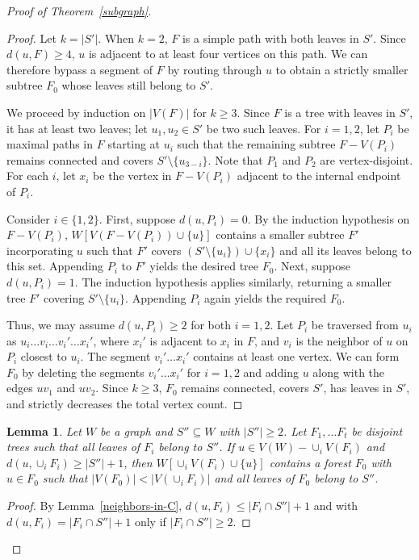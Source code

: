 \documentclass[11pt]{amsart}
\newtheorem{lemma}{Lemma}
\begin{document}
\begin{proof}[Proof of Theorem~\ref{subgraph}]
\begin{proof}
Let $k=|S'|$. When $k=2$, $F$ is a simple path with both leaves in $S'$. Since $d(u, F)\ge 4$, $u$ is adjacent to at least four vertices on this path. We can therefore bypass a segment of $F$ by routing through $u$ to obtain a strictly smaller subtree $F_0$ whose leaves still belong to $S'$. 

We proceed by induction on $|V(F)|$ for $k\ge 3$. Since $F$ is a tree with leaves in $S'$, it has at least two leaves; let $u_1, u_2\in S'$ be two such leaves. For $i=1,2$, let $P_i$ be maximal paths in $F$ starting at $u_i$ such that the remaining subtree $F-V(P_i)$ remains connected and covers $S'\setminus\{u_{3-i}\}$. Note that $P_1$ and $P_2$ are vertex-disjoint. For each $i$, let $x_i$ be the vertex in $F-V(P_i)$ adjacent to the internal endpoint of $P_i$.

Consider $i \in \{1,2\}$. First, suppose $d(u, P_i)=0$. By the induction hypothesis on $F-V(P_i)$, $W[V(F-V(P_i))\cup \{u\}]$ contains a smaller subtree $F'$ incorporating $u$ such that $F'$ covers $(S'\setminus\{u_i\})\cup \{x_i\}$ and all its leaves belong to this set. Appending $P_i$ to $F'$ yields the desired tree $F_0$. 
Next, suppose $d(u, P_i)=1$. The induction hypothesis applies similarly, returning a smaller tree $F'$ covering $S'\setminus\{u_i\}$. Appending $P_i$ again yields the required $F_0$.

Thus, we may assume $d(u, P_i)\ge 2$ for both $i=1,2$. Let $P_i$ be traversed from $u_i$ as $u_i \dots v_i \dots v_i' \dots x_i'$, where $x_i'$ is adjacent to $x_i$ in $F$, and $v_i$ is the neighbor of $u$ on $P_i$ closest to $u_i$. The segment $v_i' \dots x_i'$ contains at least one vertex. We can form $F_0$ by deleting the segments $v_i' \dots x_i'$ for $i=1,2$ and adding $u$ along with the edges $uv_1$ and $uv_2$. Since $k \ge 3$, $F_0$ remains connected, covers $S'$, has leaves in $S'$, and strictly decreases the total vertex count.
\end{proof}


\begin{lemma}
Let $W$ be a graph and $S''\subseteq W$ with $|S''|\ge 2$. Let $F_1, \ldots F_t$ be disjoint trees such that all leaves of $F_i$ belong to $S''$. If $u\in V(W)-\cup_i V(F_i)$ and $d(u, \cup_i F_i)\ge |S''|+1$, then $W[\cup_i V(F_i)\cup \{u\}]$ contains a forest $F_0$ with $u\in F_0$ such that $|V(F_0)|<|V(\cup_i F_i)|$ and all leaves of $F_0$ belong to $S''$. 
\end{lemma}

\begin{proof}
    By Lemma~\ref{neighbors-in-C}, $d(u, F_i)\le |F_i\cap S''|+1$ and with $d(u,F_i)=|F_i\cap S''|+1$ only if $|F_i\cap S''|\ge 2$. 
\end{proof}


\end{proof}
\end{document}
